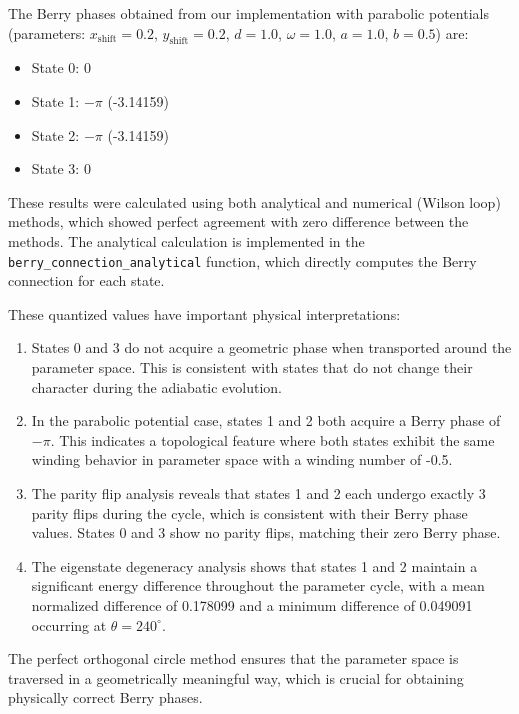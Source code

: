\documentclass[12pt,a4paper]{article}
\begin{document}
The Berry phases obtained from our implementation with parabolic potentials (parameters: $x_{\text{shift}}=0.2$, $y_{\text{shift}}=0.2$, $d=1.0$, $\omega=1.0$, $a=1.0$, $b=0.5$) are:

\begin{itemize}
    \item State 0: 0
    \item State 1: $-\pi$ (-3.14159)
    \item State 2: $-\pi$ (-3.14159)
    \item State 3: 0
\end{itemize}

These results were calculated using both analytical and numerical (Wilson loop) methods, which showed perfect agreement with zero difference between the methods. The analytical calculation is implemented in the \texttt{berry\_connection\_analytical} function, which directly computes the Berry connection for each state.

These quantized values have important physical interpretations:

\begin{enumerate}
    \item States 0 and 3 do not acquire a geometric phase when transported around the parameter space. This is consistent with states that do not change their character during the adiabatic evolution.
    
    \item In the parabolic potential case, states 1 and 2 both acquire a Berry phase of $-\pi$. This indicates a topological feature where both states exhibit the same winding behavior in parameter space with a winding number of -0.5.
    
    \item The parity flip analysis reveals that states 1 and 2 each undergo exactly 3 parity flips during the cycle, which is consistent with their Berry phase values. States 0 and 3 show no parity flips, matching their zero Berry phase.
    
    \item The eigenstate degeneracy analysis shows that states 1 and 2 maintain a significant energy difference throughout the parameter cycle, with a mean normalized difference of 0.178099 and a minimum difference of 0.049091 occurring at $\theta = 240^\circ$.
\end{enumerate}

The perfect orthogonal circle method ensures that the parameter space is traversed in a geometrically meaningful way, which is crucial for obtaining physically correct Berry phases.
\end{document}
